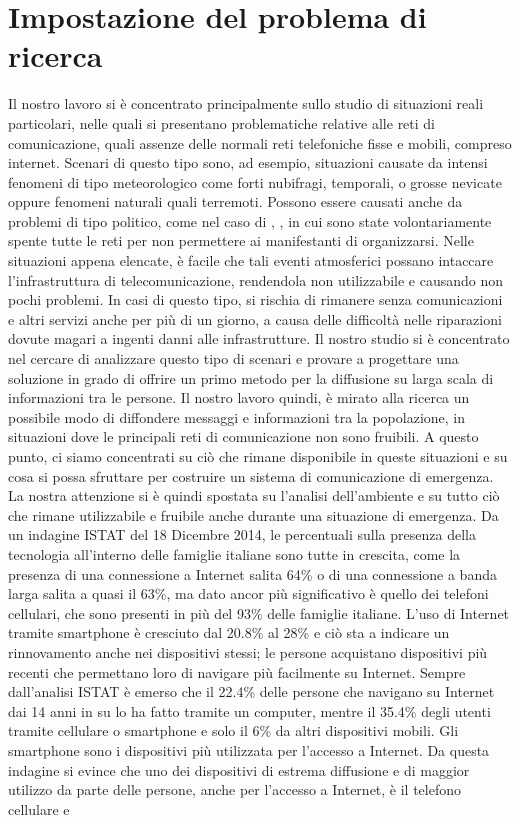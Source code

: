 \chapter{Impostazione del problema di ricerca}
\label{chap:impost_prob_ricerca}

Il nostro lavoro si è concentrato principalmente sullo studio di situazioni reali particolari, nelle quali si presentano problematiche relative alle reti di comunicazione, quali assenze delle normali reti telefoniche fisse e mobili, compreso internet. Scenari di questo tipo sono, ad esempio, situazioni causate da intensi fenomeni di tipo meteorologico come forti nubifragi, temporali, o grosse nevicate oppure fenomeni naturali quali terremoti. Possono essere causati anche da problemi di tipo politico, come nel caso di \cite{wemakehistory2014-articolo}, \cite{wemakehistory2014-fattoq}, \cite{wemakehistory2014-lastampa} in cui sono state volontariamente spente tutte le reti per non permettere ai manifestanti di organizzarsi. Nelle situazioni appena elencate, è facile che tali eventi atmosferici possano intaccare l'infrastruttura di telecomunicazione, rendendola non utilizzabile e causando non pochi problemi. In casi di questo tipo, si rischia di rimanere senza comunicazioni e altri servizi anche per più di un giorno, a causa delle difficoltà nelle riparazioni dovute magari a ingenti danni alle infrastrutture. Il nostro studio si è concentrato nel cercare di analizzare questo tipo di scenari e provare a progettare una soluzione in grado di offrire un primo metodo per la diffusione su larga scala di informazioni tra le persone. Il nostro lavoro quindi, è mirato alla ricerca un possibile modo di diffondere messaggi e informazioni tra la popolazione, in situazioni dove le principali reti di comunicazione non sono fruibili. A questo punto, ci siamo concentrati su ciò che rimane disponibile in queste situazioni e su cosa si possa sfruttare per costruire un sistema di comunicazione di emergenza. La nostra attenzione si è quindi spostata su l'analisi dell'ambiente e su tutto ciò che rimane utilizzabile e fruibile anche durante una situazione di emergenza. Da un indagine ISTAT \cite{istat2014} del 18 Dicembre 2014, le percentuali sulla presenza della tecnologia all'interno delle famiglie italiane sono tutte in crescita, come la presenza di una connessione a Internet salita 64\% o di una connessione a banda larga salita a quasi il 63\%, ma dato ancor più significativo è quello dei telefoni cellulari, che sono presenti in più del 93\% delle famiglie italiane. L'uso di Internet tramite smartphone è cresciuto dal 20.8\% al 28\% e ciò sta a indicare un rinnovamento anche nei dispositivi stessi; le persone acquistano dispositivi più recenti che permettano loro di navigare più facilmente su Internet. Sempre dall'analisi ISTAT è emerso che il 22.4\% delle persone che navigano su Internet dai 14 anni in su lo ha fatto tramite un computer, mentre il 35.4\% degli utenti tramite cellulare o smartphone e solo il 6\% da altri dispositivi mobili. Gli smartphone sono i dispositivi più utilizzata per l'accesso a Internet. Da questa indagine si evince che uno dei dispositivi di estrema diffusione e di maggior utilizzo da parte delle persone, anche per l'accesso a Internet, è il telefono cellulare e 